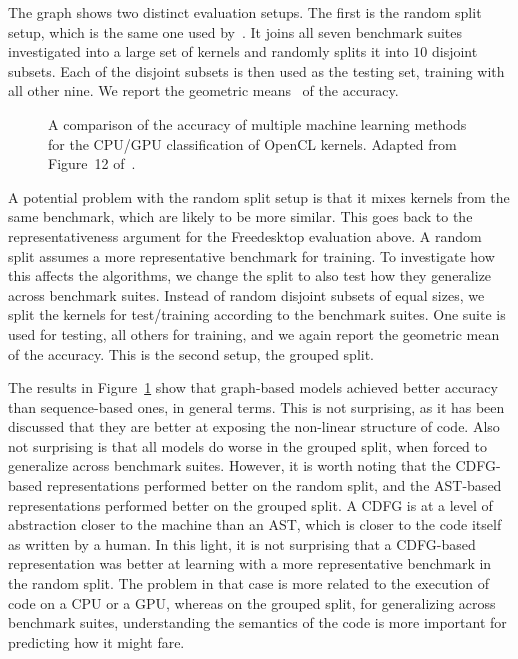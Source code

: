 The graph shows two distinct evaluation setups.
The first is the random split setup, which is the same one used by~\cite{cummins_pact17,inst2vec}.
It joins all seven benchmark suites investigated into a large set of kernels and randomly splits it into $10$ disjoint subsets.
Each of the disjoint subsets is then used as the testing set, training with all other nine.
We report the geometric means~\cite{fleming1986gmean} of the accuracy.

\begin{figure}[h]
	\centering
\resizebox{0.95\textwidth}{!}{
     
     }
   \caption{A comparison of the accuracy of multiple machine learning methods for the \ac{CPU}/\ac{GPU} classification of OpenCL kernels. Adapted from Figure~12 of~\cite{brauckmann_cc20}.}
   \label{fig:graph_representations_code}
\end{figure}

A potential problem with the random split setup is that it mixes kernels from the same benchmark, which are likely to be more similar. 
This goes back to the representativeness argument for the Freedesktop evaluation above.
A random split assumes a more representative benchmark for training.
To investigate how this affects the algorithms, we change the split to also test how they generalize across benchmark suites.
Instead of random disjoint subsets of equal sizes, we split the kernels for test/training according to the benchmark suites.
One suite is used for testing, all others for training, and we again report the geometric mean of the accuracy.
This is the second setup, the grouped split.

The results in Figure~\ref{fig:graph_representations_code} show that graph-based models achieved better accuracy than sequence-based ones, in general terms.
This is not surprising, as it has been discussed that they are better at exposing the non-linear structure of code.
Also not surprising is that all models do worse in the grouped split, when forced to generalize across benchmark suites.
However, it is worth noting that the \ac{CDFG}-based representations performed better on the random split, and the \ac{AST}-based representations performed better on the grouped split.
A \ac{CDFG} is at a level of abstraction closer to the machine than an \ac{AST}, which is closer to the code itself as written by a human.
In this light, it is not surprising that a \ac{CDFG}-based representation was better at learning with a more representative benchmark in the random split.
The problem in that case is more related to the execution of code on a \ac{CPU} or a \ac{GPU}, whereas on the grouped split, for generalizing across benchmark suites, understanding the semantics of the code is more important for predicting how it might fare.


